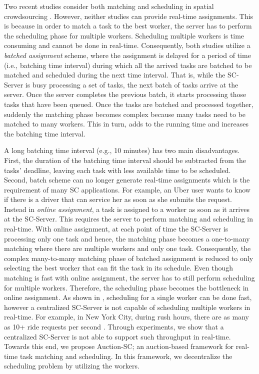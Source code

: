 Two recent studies consider both matching and scheduling in spatial crowdsourcing \cite{Deng15, Chen15}. However, neither studies can provide real-time assignments. This is because in order to match a task to the best worker, the server has to perform the scheduling phase for multiple workers. Scheduling multiple workers is time consuming and cannot be done in real-time. Consequently, both studies utilize a \textit{batched assignment} scheme, where the assignment is delayed for a period of time (i.e., batching time interval) during which all the arrived tasks are batched to be matched and scheduled during the next time interval. That is, while the SC-Server is busy processing a set of tasks, the next batch of tasks arrive at the server. Once the server completes the previous batch, it starts processing those tasks that have been queued. Once the tasks are batched and processed together, suddenly the matching phase becomes complex because many tasks need to be matched to many workers. This in turn, adds to the running time and increases the batching time interval.

A long batching time interval (e.g., 10 minutes) has two main disadvantages.  First, the duration of the batching time interval should be subtracted from the tasks' deadline, leaving each task with less available time to be scheduled. Second, batch scheme can no longer generate real-time assignments which is the requirement of many SC applications. For example, an Uber user wants to know if there is a driver that can service her as soon as she submits the request. Instead in \textit{online assignment}, a task is assigned to a worker as soon as it arrives at the SC-Server. This requires the server to perform matching and scheduling in real-time. With online assignment, at each point of time the SC-Server is processing only one task and hence, the matching phase becomes a one-to-many matching where there are multiple workers and only one task. Consequently, the complex many-to-many matching phase of batched assignment is reduced to only selecting the best worker that can fit the task in its schedule. Even though matching is fast with online assignment, the server has to still perform scheduling for multiple workers. Therefore, the scheduling phase becomes the bottleneck in online assignment. As shown in \cite{Li15}, scheduling for a single worker can be done fast, however a centralized SC-Server is not capable of scheduling multiple workers in real-time. For example, in New York City, during rush hours, there are as many as 10+ ride requests per second \cite{NYCTaxi}. Through experiments, we show that a centralized SC-Server is not able to support such throughput in real-time. Towards this end, we propose Auction-SC; an auction-based framework for real-time task matching and scheduling. In this framework, we decentralize the scheduling problem by utilizing the workers.

